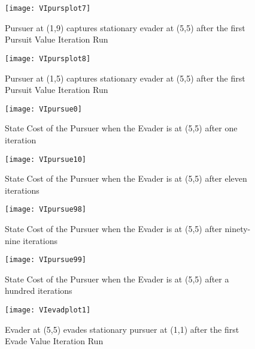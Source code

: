 \begin{figure}
\vspace{2.4in}
\centering
\texttt{[image: VIpursplot7]}
\caption{Pursuer at (1,9) captures stationary evader at (5,5) after the first Pursuit Value Iteration Run}
\label{VIpursplot7}
\end{figure}
\clearpage
\newpage

\begin{figure}
\vspace{2.4in}
\centering
\texttt{[image: VIpursplot8]}
\caption{Pursuer at (1,5) captures stationary evader at (5,5) after the first Pursuit Value Iteration Run}
\label{VIpursplot8}
\end{figure}
\clearpage
\newpage

\begin{figure}
\vspace{2.4in}
\centering
\texttt{[image: VIpursue0]}
\caption{State Cost of the Pursuer when the Evader is at (5,5) after one iteration}
\label{VIpursue0}
\end{figure}
\clearpage
\newpage

\begin{figure}
\vspace{2.4in}
\centering
\texttt{[image: VIpursue10]}
\caption{State Cost of the Pursuer when the Evader is at (5,5) after eleven iterations}
\label{VIpursue10}
\end{figure}
\clearpage
\newpage

\begin{figure}
\vspace{2.4in}
\centering
\texttt{[image: VIpursue98]}
\caption{State Cost of the Pursuer when the Evader is at (5,5) after ninety-nine iterations}
\label{VIpursue98}
\end{figure}
\clearpage
\newpage

\begin{figure}
\vspace{2.4in}
\centering
\texttt{[image: VIpursue99]}
\caption{State Cost of the Pursuer when the Evader is at (5,5) after a hundred iterations}
\label{VIpursue99}
\end{figure}
\clearpage
\newpage

\begin{figure}
\vspace{2.4in}
\centering
\texttt{[image: VIevadplot1]}
\caption{Evader at (5,5) evades stationary pursuer at (1,1) after the first Evade Value Iteration Run}
\label{VIevadplot1}
\end{figure}
\clearpage
\newpage

